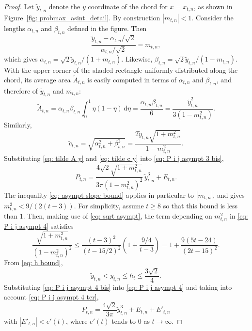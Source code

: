 \documentclass[12pt, a4paper]{article}
\newcommand{\diff}{\mathrm d}
\newcommand{\tiles}{t} %
\newcommand{\lra}{\alpha}
\newcommand{\lrb}{\beta}
\begin{document}
\begin{proof}
Let $\tilde y_{\tiles,n}$ denote the $y$ coordinate of the chord for $x = x_{\tiles,n}$, as shown in Figure~\ref{fig: probmax_asint_detail}. By construction $|m_{\tiles,n}|<1$. Consider the lengths $\lra_{\tiles,n}$ and $\lrb_{\tiles,n}$ defined in the figure. Then
\begin{equation}
\frac{\tilde y_{\tiles,n}-\lra_{\tiles,n}/\sqrt{2}}{\lra_{\tiles,n}/\sqrt{2}} = m_{\tiles,n},
\end{equation}
which gives $\lra_{\tiles,n} = \sqrt{2}\tilde y_{\tiles,n}/(1+m_{\tiles,n})$. Likewise, $\lrb_{\tiles,n} = \sqrt{2}\tilde y_{\tiles,n}/(1-m_{\tiles,n})$. With the upper corner of the shaded rectangle uniformly distributed along the chord, its average area $\tilde A_{\tiles,n}$ is easily computed in terms of $\lra_{\tiles,n}$ and $\lrb_{\tiles,n}$, and therefore of $\tilde y_{\tiles,n}$ and $m_{\tiles,n}$:
\begin{equation}
\label{eq: tilde A y}
\tilde A_{\tiles,n} = \lra_{\tiles,n}\lrb_{\tiles,n} \int_0^1 \eta(1-\eta)\, \diff \eta = \frac{\lra_{\tiles,n}\lrb_{\tiles,n}} 6 = \frac{\tilde y_{\tiles,n}^2}{3(1-m_{\tiles,n}^2)}.
\end{equation}
Similarly,
\begin{equation}
\label{eq: tilde c y}
\tilde c_{\tiles,n} = \sqrt{\lra_{\tiles,n}^2+\lrb_{\tiles,n}^2} = \frac {2 \tilde y_{\tiles,n} \sqrt{1+m_{\tiles,n}^2}} {1-m_{\tiles,n}^2}.
\end{equation}
Substituting \eqref{eq: tilde A y} and \eqref{eq: tilde c y} into \eqref{eq: P i j asympt 3 bis},
\begin{equation}
\label{eq: P i j asympt 4}
P_{\tiles,n}
= \frac{4\sqrt{2} \sqrt{1+m_{\tiles,n}^2}} {3\pi(1-m_{\tiles,n}^2)^2}\, \tilde y_{\tiles,n}^3 + E_{\tiles, n}.
\end{equation}
The inequality \eqref{eq: asympt slope bound} applies in particular to $|m_{\tiles,n}|$, and gives $m_{\tiles,n}^2 < 9/(2(\tiles-3))$. For simplicity, assume $\tiles \geq 8$ so that this bound is less than $1$. Then, making use of \eqref{eq: sqrt asympt}, the term depending on $m_{\tiles,n}^2$ in \eqref{eq: P i j asympt 4} satisfies
\begin{equation}
\label{eq: P i j asympt 4 bis}
\frac{\sqrt{1+m_{\tiles, n}^2}} {(1-m_{\tiles, n}^2)^2} \leq \frac{(\tiles-3)^2}{(\tiles-15/2)^2} \left(1+\frac {9/4} {\tiles-3}\right) = 1 + \frac{9(5\tiles - 24)}{(2\tiles-15)^2}.
\end{equation}
From \eqref{eq: h bound},
\begin{equation}
\label{eq: P i j asympt 4 ter}
\tilde y_{\tiles,n} < y_{\tiles,n} \leq h_\tiles \leq \frac{3\sqrt{2}} 4.
\end{equation}
Substituting \eqref{eq: P i j asympt 4 bis} into \eqref{eq: P i j asympt 4} and taking into account \eqref{eq: P i j asympt 4 ter},
\begin{equation}
\label{eq: P i j asympt 5}
P_{\tiles,n} = \frac{4\sqrt{2}} {3\pi} \tilde y_{\tiles,n}^3 + E_{\tiles,n} + E'_{\tiles,n}
\end{equation}
with $|E'_{\tiles,n}| < e'(t)$, where $e'(t)$ tends to $0$ as $t \rightarrow \infty$.


\end{proof}
\end{document}
